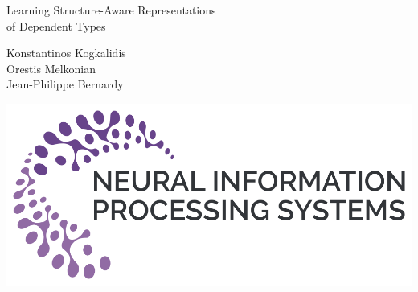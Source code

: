 \documentclass{article}
\newcommand{\titlefont}{\fontsize{55}{55}\selectfont\setlength{\parskip}{1\baselineskip}}
\newcommand{\nfont}{\fontsize{21}{22}\selectfont\setlength{\parskip}{1\baselineskip}}
\begin{document}
	\begin{minipage}{\textwidth}
		\begin{minipage}{0.5\textwidth}
			\titlefont
			Learning Structure-Aware Representations \\of Dependent Types
		\end{minipage}%
		\begin{minipage}{0.3\textwidth}
			\nfont
			Konstantinos Kogkalidis\\
			Orestis Melkonian\\
			Jean-Philippe Bernardy\\
		\end{minipage}\hfill
		\begin{minipage}{0.15\textwidth}
			\includegraphics[width=\textwidth]{NeurIPS_logo.png}
		\end{minipage}
	\end{minipage}
	\vspace{0.5in}
\end{document}
